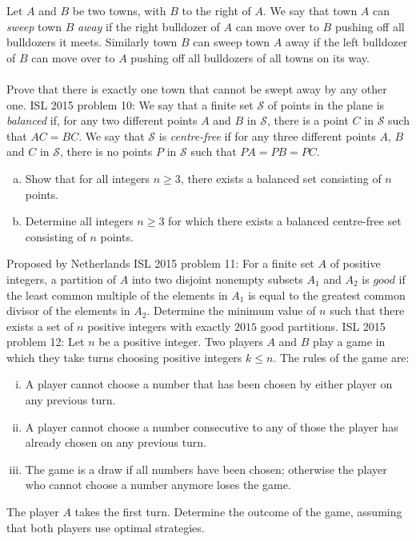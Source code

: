 Let $A$ and $B$ be two towns, with $B$ to the right of $A$. We say that town $A$ can \textit{sweep} town $B$ \textit{away} if the right bulldozer of $A$ can move over to $B$ pushing off all bulldozers it meets. Similarly town $B$ can sweep town $A$ away if the left bulldozer of $B$ can move over to $A$ pushing off all bulldozers of all towns on its way. \\\\
Prove that there is exactly one town that cannot be swept away by any other one. 
ISL 2015 problem 10:  We say that a finite set $\mathcal{S}$ of points in the plane is \textit{balanced} if, for any two different points $A$ and $B$ in $\mathcal{S}$, there is a point $C$ in $\mathcal{S}$ such that $AC=BC$. We say that $\mathcal{S}$ is \textit{centre-free} if for any three different points $A$, $B$ and $C$ in $\mathcal{S}$, there is no points $P$ in $\mathcal{S}$ such that $PA=PB=PC$.
\begin{enumerate}[(a)]
  \item Show that for all integers $n\ge 3$, there exists a balanced set consisting of $n$ points.
  \item Determine all integers $n\ge 3$ for which there exists a balanced centre-free set consisting of $n$ points.
\end{enumerate}
Proposed by Netherlands 
ISL 2015 problem 11:  For a finite set $A$ of positive integers, a partition of $A$ into two disjoint nonempty subsets $A_1$ and $A_2$ is $\textit{good}$ if the least common multiple of the elements in $A_1$ is equal to the greatest common divisor of the elements in $A_2$. Determine the minimum value of $n$ such that there exists a set of $n$ positive integers with exactly $2015$ good partitions. 
ISL 2015 problem 12:  Let $n$ be a positive integer. Two players $A$ and $B$ play a game in which they take turns choosing positive integers $k \le n$. The rules of the game are:
\begin{enumerate}[(i)]
  \item A player cannot choose a number that has been chosen by either player on any previous turn.
  \item A player cannot choose a number consecutive to any of those the player has already chosen on any previous turn.
  \item The game is a draw if all numbers have been chosen; otherwise the player who cannot choose a number anymore loses the game.
\end{enumerate}
The player $A$ takes the first turn. Determine the outcome of the game, assuming that both players use optimal strategies. \\\\
